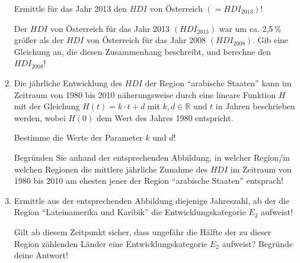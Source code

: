 \begin{langesbeispiel}
\begin{enumerate}
Ermittle für das Jahr 2013 den $HDI$ von Österreich $(=HDI_{2013})$!\leer

Der $HDI$ von Österreich für das Jahr 2013 $(HDI_{2013})$ war um ca. 2,5\,\% größer als der $HDI$ von Österreich für das Jahr 2008 $(HDI_{2008})$. Gib eine Gleichung an, die diesen Zusammenhang beschreibt, und berechne den $HDI_{2008}$!

\item Die jährliche Entwicklung des $HDI$ der Region "`arabische Staaten"' kann im Zeitraum von 1980 bis 2010 näherungsweise durch eine lineare Funktion $H$ mit der Gleichung $H(t) = k \cdot t + d$ mit $k, d \in \mathbb R$ und $t$ in Jahren beschrieben werden, wobei $H(0)$ dem Wert des Jahres 1980 entspricht.\leer

Bestimme die Werte der Parameter $k$ und $d$!\leer

Begründen Sie anhand der entsprechenden Abbildung, in welcher Region/in welchen Regionen die mittlere jährliche Zunahme des $HDI$ im Zeitraum von 1980 bis 2010 am ehesten jener der
Region "`arabische Staaten"' entsprach!

\item {} Ermittle aus der entsprechenden Abbildung diejenige Jahreszahl, ab der die Region "`Lateinamerika und Karibik"' die Entwicklungskategorie $E_2$ aufweist!\leer

Gilt ab diesem Zeitpunkt sicher, dass ungefähr die Hälfte der zu dieser Region zählenden Länder
eine Entwicklungskategorie $E_2$ aufweist? Begründe deine Antwort!	
\end{enumerate}

\end{langesbeispiel}
